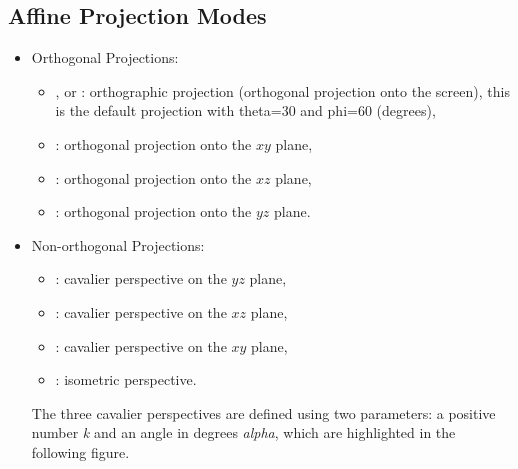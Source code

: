 \subsection{Affine Projection Modes}

\begin{itemize}
    \item Orthogonal Projections:
    \begin{itemize}
        \item {}, or : orthographic projection (orthogonal projection onto the screen), this is the default projection with theta=30 and phi=60 (degrees),
        \item {}: orthogonal projection onto the $xy$ plane,
        \item {}: orthogonal projection onto the $xz$ plane,
        \item {}: orthogonal projection onto the $yz$ plane.
    \end{itemize}
    \item Non-orthogonal Projections:
    \begin{itemize}
        \item {}: cavalier perspective on the $yz$ plane,
        \item {}: cavalier perspective on the $xz$ plane,
        \item {}: cavalier perspective on the $xy$ plane,
        \item {}: isometric perspective.
    \end{itemize}
    The three cavalier perspectives are defined using two parameters: a positive number \emph{k} and an angle in degrees \emph{alpha}, which are highlighted in the following figure.
\end{itemize}

